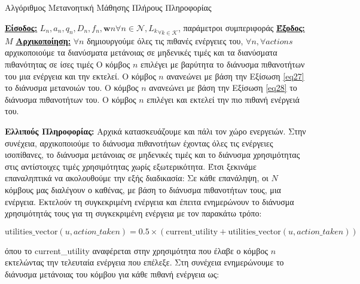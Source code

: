 \begin{algorithm}[h]
\caption{Αλγόριθμος Μετανοητική Μάθησης Πλήρους Πληροφορίας} \label{algorithm 5}
\begin{algorithmic}[1]
\STATE \textbf{\underline{Είσοδος:}} ${L_n, a_n, q_n, D_n, f_n, \mathbf{w}n}{\forall n\in \mathcal{N}}, {L_k}_{\forall k \in \mathcal{K}}$, παράμετροι συμπεριφοράς
\STATE \textbf{\underline{Έξοδος:}}  $M$
\STATE \textbf{\underline{Αρχικοποίηση:}} $\forall n$ δημιουργούμε όλες τις πιθανές ενέργειες του, $\forall n, \forall actions$ αρχικοποιούμε τα διανύσματα μετάνοιας σε μηδενικές τιμές και τα διανύσματα πιθανότητας σε ίσες τιμές
\STATE Ο κόμβος $n$ επιλέγει με βαρύτητα το διάνυσμα πιθανοτήτων του μια ενέργεια και την εκτελεί.
\ENDFOR
{}
\STATE Ο κόμβος $n$ ανανεώνει με βάση την Εξίσωση \ref{eq27} το διάνυσμα μετανοιών του.
\STATE Ο κόμβος $n$ ανανεώνει με βάση την Εξίσωση \ref{eq28} το διάνυσμα πιθανοτήτων του.
\ENDFOR
\ENDWHILE
{}
\STATE Ο κόμβος $n$ επιλέγει και εκτελεί την πιο πιθανή ενέργειά του.
\ENDFOR
\end{algorithmic}
\end{algorithm}

\textbf{Ελλιπούς Πληροφορίας:} Αρχικά κατασκευάζουμε και πάλι τον χώρο ενεργειών. Στην συνέχεια, αρχικοποιούμε το διάνυσμα πιθανοτήτων έχοντας όλες τις ενέργειες ισοπίθανες, το διάνυσμα μετάνοιας σε μηδενικές τιμές και το διάνυσμα χρησιμότητας στις αντίστοιχες τιμές χρησιμότητας χωρίς εξωτερικότητα. Έτσι ξεκινάμε επαναληπτικά να ακολουθούμε την εξής διαδικασία: Σε κάθε επανάληψη, οι $N$ κόμβους μας διαλέγουν ο καθένας, με βάση το διάνυσμα πιθανοτήτων τους, μια ενέργεια. Εκτελούν τη συγκεκριμένη ενέργεια και έπειτα ενημερώνουν το διάνυσμα χρησιμότητάς τους για τη συγκεκριμένη ενέργεια με τον παρακάτω τρόπο:

\vspace{-5pt}

\begin{equation}
    \text{utilities\_vector}(u,action\_taken) = 0.5 \times \left(\text{current\_utility} + \text{utilities\_vector}(u,action\_taken)\right)
\label{eq29}
\end{equation}

\vspace{-3pt}

\noindent
όπου το current\_utility αναφέρεται στην χρησιμότητα που έλαβε ο κόμβος $n$ εκτελώντας την τελευταία ενέργεια που επέλεξε. Στη συνέχεια ενημερώνουμε το διάνυσμα μετάνοιας του κόμβου για κάθε πιθανή ενέργεια ως:

